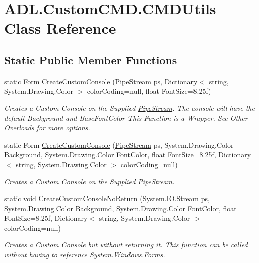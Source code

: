 \hypertarget{class_a_d_l_1_1_custom_c_m_d_1_1_c_m_d_utils}{}\section{A\+D\+L.\+Custom\+C\+M\+D.\+C\+M\+D\+Utils Class Reference}
\label{class_a_d_l_1_1_custom_c_m_d_1_1_c_m_d_utils}
\subsection*{Static Public Member Functions}
\begin{DoxyCompactItemize}
\item 
static Form \mbox{\hyperlink{class_a_d_l_1_1_custom_c_m_d_1_1_c_m_d_utils_aef482d360188b9439a20d62f170d7718}{Create\+Custom\+Console}} (\mbox{\hyperlink{class_a_d_l_1_1_pipe_stream}{Pipe\+Stream}} ps, Dictionary$<$ string, System.\+Drawing.\+Color $>$ color\+Coding=null, float Font\+Size=8.\+25f)
\begin{DoxyCompactList}\small\item\em Creates a Custom Console on the Supplied \mbox{\hyperlink{class_a_d_l_1_1_pipe_stream}{Pipe\+Stream}}. The console will have the default Background and Base\+Font\+Color This Function is a Wrapper. See Other Overloads for more options. \end{DoxyCompactList}\item 
static Form \mbox{\hyperlink{class_a_d_l_1_1_custom_c_m_d_1_1_c_m_d_utils_ad2f353a5936cfefbece698ad2c7c315b}{Create\+Custom\+Console}} (\mbox{\hyperlink{class_a_d_l_1_1_pipe_stream}{Pipe\+Stream}} ps, System.\+Drawing.\+Color Background, System.\+Drawing.\+Color Font\+Color, float Font\+Size=8.\+25f, Dictionary$<$ string, System.\+Drawing.\+Color $>$ color\+Coding=null)
\begin{DoxyCompactList}\small\item\em Creates a Custom Console on the Supplied \mbox{\hyperlink{class_a_d_l_1_1_pipe_stream}{Pipe\+Stream}}. \end{DoxyCompactList}\item 
static void \mbox{\hyperlink{class_a_d_l_1_1_custom_c_m_d_1_1_c_m_d_utils_ad1ced26069f98da85bfa1e5dd451e539}{Create\+Custom\+Console\+No\+Return}} (System.\+I\+O.\+Stream ps, System.\+Drawing.\+Color Background, System.\+Drawing.\+Color Font\+Color, float Font\+Size=8.\+25f, Dictionary$<$ string, System.\+Drawing.\+Color $>$ color\+Coding=null)
\begin{DoxyCompactList}\small\item\em Creates a Custom Console but without returning it. This function can be called without having to reference System.\+Windows.\+Forms. \end{DoxyCompactList}\item 

\end{DoxyCompactItemize}
